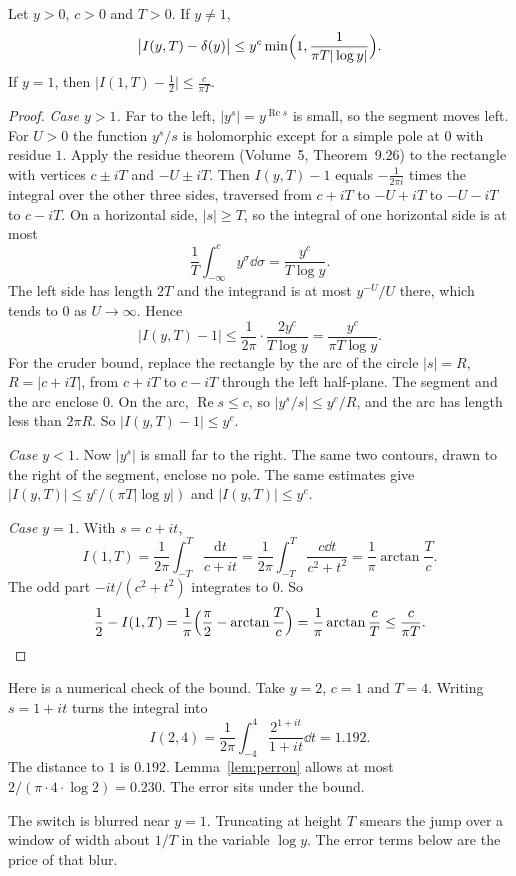 \begin{lemma}[Perron]\label{lem:perron}
Let $y>0$, $c>0$ and $T>0$. If $y\ne1$,
\[
\bigl|I(y,T)-\delta(y)\bigr|\le y^c\min\Bigl(1,\frac1{\pi T|\log y|}\Bigr).
\]
If $y=1$, then $\bigl|I(1,T)-\frac12\bigr|\le\frac c{\pi T}$.
\end{lemma}
\begin{proof}
\emph{Case $y>1$.} Far to the left, $|y^s|=y^{\operatorname{Re}s}$ is small, so the segment moves left. For $U>0$ the function $y^s/s$ is holomorphic except for a simple pole at $0$ with residue $1$. Apply the residue theorem (Volume~5, Theorem~9.26) to the rectangle with vertices $c\pm iT$ and $-U\pm iT$. Then $I(y,T)-1$ equals $-\frac1{2\pi i}$ times the integral over the other three sides, traversed from $c+iT$ to $-U+iT$ to $-U-iT$ to $c-iT$. On a horizontal side, $|s|\ge T$, so the integral of one horizontal side is at most
\[
\frac1T\int_{-\infty}^c y^\sigma\dd\sigma=\frac{y^c}{T\log y}.
\]
The left side has length $2T$ and the integrand is at most $y^{-U}/U$ there, which tends to $0$ as $U\to\infty$. Hence
\[
|I(y,T)-1|\le\frac1{2\pi}\cdot\frac{2y^c}{T\log y}=\frac{y^c}{\pi T\log y}.
\]
For the cruder bound, replace the rectangle by the arc of the circle $|s|=R$, $R=|c+iT|$, from $c+iT$ to $c-iT$ through the left half-plane. The segment and the arc enclose $0$. On the arc, $\operatorname{Re}s\le c$, so $|y^s/s|\le y^c/R$, and the arc has length less than $2\pi R$. So $|I(y,T)-1|\le y^c$.

\emph{Case $y<1$.} Now $|y^s|$ is small far to the right. The same two contours, drawn to the right of the segment, enclose no pole. The same estimates give $|I(y,T)|\le y^c/(\pi T|\log y|)$ and $|I(y,T)|\le y^c$.

\emph{Case $y=1$.} With $s=c+it$,
\[
I(1,T)=\frac1{2\pi}\int_{-T}^T\frac{\mathrm dt}{c+it}=\frac1{2\pi}\int_{-T}^T\frac{c\dd t}{c^2+t^2}=\frac1\pi\arctan\frac Tc.
\]
The odd part $-it/(c^2+t^2)$ integrates to $0$. So
\[
\frac12-I(1,T)=\frac1\pi\Bigl(\frac\pi2-\arctan\frac Tc\Bigr)=\frac1\pi\arctan\frac cT\le\frac c{\pi T}.
\]
\end{proof}

Here is a numerical check of the bound. Take $y=2$, $c=1$ and $T=4$. Writing $s=1+it$ turns the integral into
\[
I(2,4)=\frac1{2\pi}\int_{-4}^{4}\frac{2^{1+it}}{1+it}\dd t=1.192.
\]
The distance to $1$ is $0.192$. Lemma~\ref{lem:perron} allows at most $2/(\pi\cdot4\cdot\log2)=0.230$. The error sits under the bound.

The switch is blurred near $y=1$. Truncating at height $T$ smears the jump over a window of width about $1/T$ in the variable $\log y$. The error terms below are the price of that blur.

